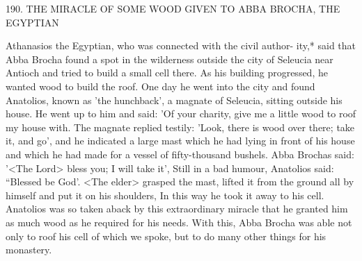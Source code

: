 190. THE MIRACLE OF SOME WOOD GIVEN TO
ABBA BROCHA, THE EGYPTIAN

Athanasios the Egyptian, who was connected with the civil author-
ity,* said that Abba Brocha found a spot in the wilderness outside
the city of Seleucia near Antioch and tried to build a small cell
there. As his building progressed, he wanted wood to build the roof.
One day he went into the city and found Anatolios, known as 'the
hunchback', a magnate of Seleucia, sitting outside his house. He
went up to him and said: 'Of your charity, give me a little wood to
roof my house with. The magnate replied testily: 'Look, there is
wood over there; take it, and go', and he indicated a large mast
which he had lying in front of his house and which he had made for
a vessel of fifty-thousand bushels. Abba Brochas said: '<The Lord>
bless you; I will take it', Still in a bad humour, Anatolios said:
“Blessed be God'. <The elder> grasped the mast, lifted it from the
ground all by himself and put it on his shoulders, In this way he
took it away to his cell. Anatolios was so taken aback by this
extraordinary miracle that he granted him as much wood as he
required for his needs. With this, Abba Brocha was able not only to
roof his cell of which we spoke, but to do many other things for his
monastery.


